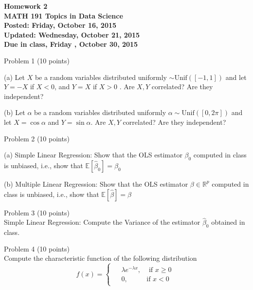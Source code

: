 \documentclass[12pt]{article}
\begin{document}
\begin{center}
{\bf Homework 2}\\
{\bf MATH 191 Topics in Data Science}\\
{\bf Posted: Friday, October 16, 2015}\\
{\bf Updated: Wednesday, October 21, 2015}\\
{\bf Due in class, Friday , October 30, 2015} \\
\end{center}

\vspace{4mm}

Problem 1 (10 points) 

(a) Let $X$ be a random variables distributed uniformly 
	$ \sim \mbox{Unif}([-1,1])$
and let $Y=-X$ if $X<0$, and $Y=X$ if $X>0$ . Are $X,Y$ correlated? Are they independent?
\vspace{3mm}

(b) Let $\alpha$ be a random variables distributed uniformly 
	$ \alpha \sim \mbox{Unif}([0 , 2 \pi])$
and let $X=\cos \alpha$ and $Y=\sin \alpha$. Are $X,Y$ correlated? Are they independent?


\vspace{3mm}
Problem 2  (10 points)

(a) Simple Linear Regression:  Show that the OLS estimator $ \beta_0 $  computed in class is unbiased, i.e., show that $ \mathbb{E}[ \hat{\beta}_0 ] = \beta_0$
\vspace{3mm}

(b) Multiple Linear Regression: Show that the OLS estimator $ \beta \in \mathbb{R}^p$  computed in class is unbiased, i.e., show that $ \mathbb{E}[ \hat{\beta}] = \beta$

\vspace{4mm}

Problem 3  (10 points)\\
Simple Linear Regression:  Compute the Variance of the estimator $\hat{\beta}_0$ obtained in class.

\vspace{4mm}

Problem 4 (10 points)\\
Compute the characteristic function of the following distribution
\[
f(x) = 
  \begin{cases}
  \begin{aligned}
  &  \lambda e^{-\lambda x}, &  \mbox{ if } x \geq 0 \\
  & 0, & \mbox{if } x < 0
  \end{aligned}
  \end{cases}
\]
\end{document}
